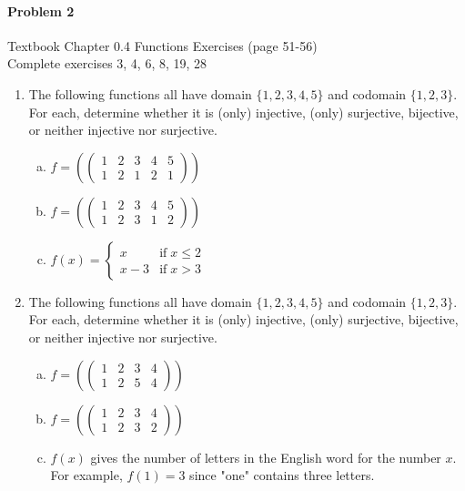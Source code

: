 \documentclass[11pt, a4paper]{article}
\newcommand\setItemNumber[1]{\setcounter{enumi}{\numexpr#1-1\relax}}
\begin{document}
	\paragraph{Problem 2} Textbook Chapter 0.4 Functions Exercises (page 51-56)\\
	Complete exercises 3, 4, 6, 8, 19, 28
		

    \begin{enumerate}

        \setItemNumber{3}
        \item The following functions all have domain $\{1,2,3,4,5\}$ and codomain $\{1,2,3\}$. For each, determine whether it is (only) injective, (only) surjective, bijective, or neither injective nor surjective.
            \begin{enumerate}[(a)]
                \item $ f = \left(\begin{pmatrix} 1 & 2 & 3 & 4 & 5 \\ 1 & 2 & 1 & 2 & 1 \end{pmatrix}\right)$
                \item $ f = \left (\begin{pmatrix} 1 & 2 & 3 & 4 & 5 \\ 1 & 2 & 3 & 1 & 2 \end{pmatrix}\right)$
                \item $ f(x) = \begin{cases} x & \text{if}\; x\leq 2\\ x - 3 & \text{if}\; x > 3\end{cases}$
            \end{enumerate}


        \setItemNumber{4}
        \item The following functions all have domain $\{1,2,3,4,5\}$ and codomain $\{1,2,3\}$. For each, determine whether it is (only) injective, (only) surjective, bijective, or neither injective nor surjective.
            \begin{enumerate}[(a)]
                \item $ f = \left(\begin{pmatrix} 1 & 2 & 3 & 4  \\ 1 & 2 & 5 & 4 \end{pmatrix}\right)$
                \item $ f = \left(\begin{pmatrix} 1 & 2 & 3 & 4 \\ 1 & 2 & 3 & 2\end{pmatrix}\right)$
                \item $f(x)$ gives the number of letters in the English word for the number $x$. For example, $f(1) = 3$ since "one" contains three letters.
            \end{enumerate}



\end{enumerate}
\end{document}
